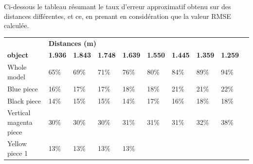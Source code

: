\documentclass[a4paper, 12pt]{book}
\begin{document}
\vspace{2cm}

Ci-dessous le tableau résumant le taux d'erreur approximatif obtenu sur des distances différentes, et ce, en  prenant en considération que la valeur RMSE  calculée. \\


\begin{table}[H]
\centering
\setlength\tabcolsep{2pt}
\begin{tabular}{c|lllllllll}
\cline{1-9}
\multicolumn{1}{|l|}{}   & 
\multicolumn{8}{l|}{\textbf{\hspace{4.5cm} Distances (m)}}    \\
\cline{1-9}
\multicolumn{1}{|l|}{\textbf{object}}   & 
\multicolumn{1}{l|}{\textbf{1.936 }} & 
\multicolumn{1}{l|}{\textbf{1.843}} & 
\multicolumn{1}{l|}{\textbf{1.748}} &  
\multicolumn{1}{l|}{\textbf{1.639 }} & 
\multicolumn{1}{l|}{\textbf{1.550}} & 
\multicolumn{1}{l|}{\textbf{1.445}} & 
\multicolumn{1}{l|}{\textbf{1.359}} & 
\multicolumn{1}{l|}{\textbf{1.259}} & \\
\cline{1-9}
\multicolumn{1}{|l|}{Whole model}  & 
\multicolumn{1}{l|}{65\%}  &  
\multicolumn{1}{l|}{69\%}  & 
\multicolumn{1}{l|}{71\%}  & 
\multicolumn{1}{l|}{76\%}  & 
\multicolumn{1}{l|}{80\%}  & 
\multicolumn{1}{l|}{84\%}  & 
\multicolumn{1}{l|}{89\%}  & 
\multicolumn{1}{l|}{94\%}  &  \\ 
\cline{1-9}
\multicolumn{1}{|l|}{Blue piece}  &
\multicolumn{1}{l|}{16\%}  &
\multicolumn{1}{l|}{17\%}  & 
\multicolumn{1}{l|}{17\%} & 
\multicolumn{1}{l|}{18\%}  & 
\multicolumn{1}{l|}{18\%}  &  
\multicolumn{1}{l|}{21\%}  & 
\multicolumn{1}{l|}{21\%}  &
\multicolumn{1}{l|}{22\%}   &  \\ 
\cline{1-9}
\multicolumn{1}{|l|}{Black piece}  & 
\multicolumn{1}{l|}{14\%}  & 
\multicolumn{1}{l|}{15\%}  & 
\multicolumn{1}{l|}{15\%} & 
\multicolumn{1}{l|}{14\%}  & 
\multicolumn{1}{l|}{17\%}  &
\multicolumn{1}{l|}{16\%}  & 
\multicolumn{1}{l|}{18\%}  & 
\multicolumn{1}{l|}{18\%}  &  \\ 
\cline{1-9}
\multicolumn{1}{|l|}{Vertical magenta piece}  & 
\multicolumn{1}{l|}{30\%}  & 
\multicolumn{1}{l|}{30\%}  & 
\multicolumn{1}{l|}{30\%} & 
\multicolumn{1}{l|}{31\%}  & 
\multicolumn{1}{l|}{31\%}  & 
\multicolumn{1}{l|}{31\%}  & 
\multicolumn{1}{l|}{32\%}  &  
\multicolumn{1}{l|}{38\%}  & \\ 
\cline{1-9}
\multicolumn{1}{|l|}{Yellow piece 1}  & 
\multicolumn{1}{l|}{13\%}  & 
\multicolumn{1}{l|}{13\%}  & 
\multicolumn{1}{l|}{13\%}  & 
\multicolumn{1}{l|}{13\%}  & 

\end{tabular}
\end{table}
\end{document}
